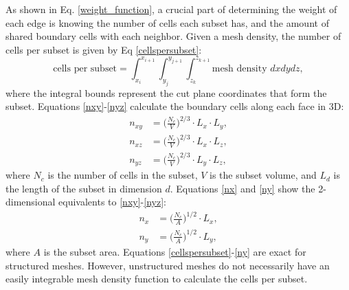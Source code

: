 As shown in Eq. \ref{weight_function}, a crucial part of determining the weight of each edge is knowing the number of cells each subset has, and the amount of shared boundary cells with each neighbor. Given a mesh density, the number of cells per subset is given by Eq \ref{cellspersubset}:
\begin{equation}
   \text{cells per subset} = \int_{x_i}^{x_{i+1}} \int_{y_j}^{y_{j+1}} \int_{z_k}^{z_{k+1}} \text{mesh density } dx dy dz,
\label{cellspersubset}
\end{equation}
where the integral bounds represent the cut plane coordinates that form the subset.
Equations \ref{nxy}-\ref{nyz} calculate the boundary cells along each face in 3D:
\begin{align}
n_{xy} &= \Big(\frac{N_c}{V}\Big)^{2/3}\cdot L_x\cdot L_y \label{nxy}, \\
n_{xz} &= \Big(\frac{N_c}{V}\Big)^{2/3}\cdot L_x\cdot L_z \label{nxz}, \\
n_{yz} &= \Big(\frac{N_c}{V}\Big)^{2/3}\cdot L_y\cdot L_z \label{nyz},
\end{align}
where $N_c$ is the number of cells in the subset, $V$ is the subset volume, and $L_d$ is the length of the subset in dimension $d$.
Equations \ref{nx} and \ref{ny} show the 2-dimensional equivalents to \ref{nxy}-\ref{nyz}:
\begin{align}
n_x &= \Big(\frac{N_c}{A}\Big)^{1/2}\cdot L_x, \label{nx} \\
n_y &= \Big(\frac{N_c}{A}\Big)^{1/2}\cdot L_y, \label{ny}
\end{align}
where $A$ is the subset area. Equations \ref{cellspersubset}-\ref{ny} are exact for structured meshes.
However, unstructured meshes do not necessarily have an easily integrable mesh density function to calculate the cells per subset.

